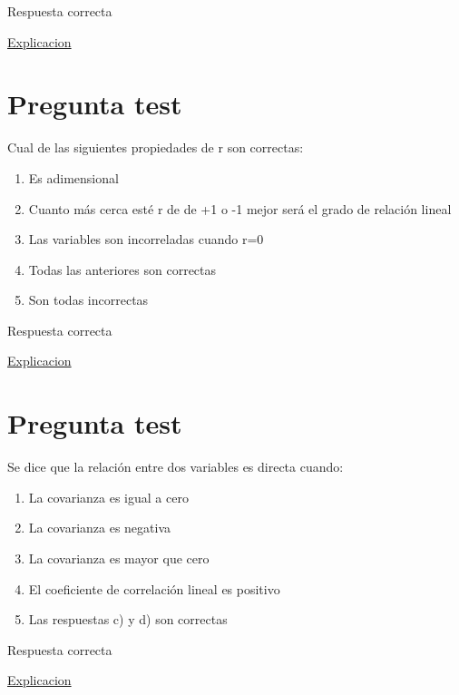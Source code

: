 \documentclass[
]{book}
\providecommand{\tightlist}{%
  \setlength{\itemsep}{0pt}\setlength{\parskip}{0pt}}
\begin{document}
Respuesta correcta

\href{https://1fjmanzano.github.io/bioestadistica/relaci\%C3\%B3n-entre-variables-nume\%CC\%81ricas.html\#coeficiente-de-correlacio\%CC\%81n}{Explicacion}

\hypertarget{pregunta-test-127}{%
\section{Pregunta test}\label{pregunta-test-127}}

Cual de las siguientes propiedades de r son correctas:

\begin{enumerate}
\def\labelenumi{\alph{enumi})}
\tightlist
\item
  Es adimensional
\item
  Cuanto más cerca esté r de de +1 o -1 mejor será el grado de relación lineal
\item
  Las variables son incorreladas cuando r=0
\item
  Todas las anteriores son correctas
\item
  Son todas incorrectas
\end{enumerate}

Respuesta correcta

\href{https://1fjmanzano.github.io/bioestadistica/relaci\%C3\%B3n-entre-variables-nume\%CC\%81ricas.html\#coeficiente-de-correlacio\%CC\%81n}{Explicacion}

\hypertarget{pregunta-test-128}{%
\section{Pregunta test}\label{pregunta-test-128}}

Se dice que la relación entre dos variables es directa cuando:

\begin{enumerate}
\def\labelenumi{\alph{enumi})}
\tightlist
\item
  La covarianza es igual a cero
\item
  La covarianza es negativa
\item
  La covarianza es mayor que cero
\item
  El coeficiente de correlación lineal es positivo
\item
  Las respuestas c) y d) son correctas
\end{enumerate}

Respuesta correcta

\href{https://1fjmanzano.github.io/bioestadistica/relaci\%C3\%B3n-entre-variables-nume\%CC\%81ricas.html\#coeficiente-de-correlacio\%CC\%81n}{Explicacion}
\end{document}

